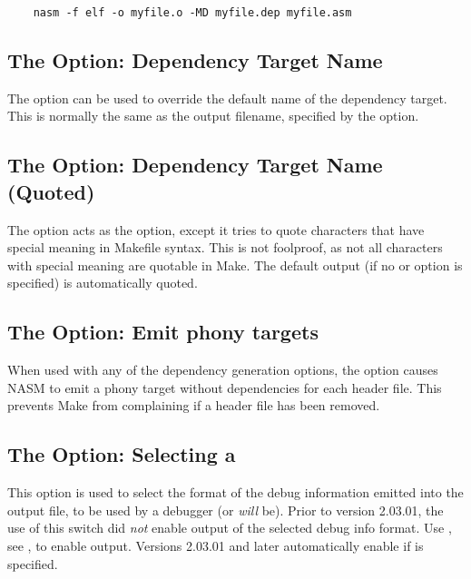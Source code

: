 \begin{lstlisting}
	nasm -f elf -o myfile.o -MD myfile.dep myfile.asm
\end{lstlisting}

\subsection{The  Option: Dependency Target Name}
\label{subsec:opt-MT-cap}

The  option can be used to override the default name of the
dependency target. This is normally the same as the output filename,
specified by the  option.

\subsection{The  Option: Dependency Target Name (Quoted)}
\label{subsec:opt-MQ-cap}

The  option acts as the  option, except
it tries to quote characters that have special meaning in Makefile
syntax. This is not foolproof, as not all characters with special
meaning are quotable in Make. The default output (if no  or
 option is specified) is automatically quoted.

\subsection{The  Option: Emit phony targets}
\label{subsec:opt-MP-cap}

When used with any of the dependency generation options, the
 option causes NASM to emit a phony target without
dependencies for each header file. This prevents Make from
complaining if a header file has been removed.

\subsection{The  Option: Selecting a }
\label{subsec:opt-F-cap}

This option is used to select the format of the debug information
emitted into the output file, to be used by a debugger (or \emph{will}
be). Prior to version 2.03.01, the use of this switch did \emph{not}
enable output of the selected debug info format. Use ,
see , to enable output. Versions 2.03.01 and later
automatically enable  if  is specified.

